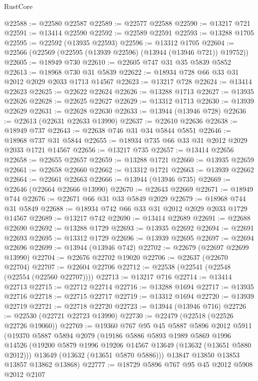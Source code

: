 \begin{lexlean}{RustCore}
\begin{coremodule}
@22588 := @22580 @22587
@22589 := @22577 @22588
@22590 := @13217 @721
@22591 := @13414 @22590
@22592 := @22589 @22591
@22593 := @13288 @1705
@22595 := @22592 (@13935 @22593)
@22596 := @13312 @1705
@22604 := @22566 (@22569 (@22595 (@13939 @22596) (@13944 (@13946 @721)) @19752))
@22605 := @18949 @730
@22610 := @22605 @747 @31 @35 @5839 @5852
@22613 := @18968 @730 @31 @5839
@22622 := @18934 @728 @66 @33 @31 @2012 @2029 @2033 @1713 @14567
@22623 := @13217 @728
@22624 := @13414 @22623
@22625 := @22622 @22624
@22626 := @13288 @1713
@22627 := @13935 @22626
@22628 := @22625 @22627
@22629 := @13312 @1713
@22630 := @13939 @22629
@22631 := @22628 @22630
@22633 := @13944 (@13946 @728)
@22636 := @22613 (@22631 @22633 @13990)
@22637 := @22610 @22636
@22638 := @18949 @737
@22643 := @22638 @746 @31 @34 @5844 @5851
@22646 := @18968 @737 @31 @5844
@22655 := @18934 @735 @66 @33 @31 @2012 @2029 @2033 @1721 @14567
@22656 := @13217 @735
@22657 := @13414 @22656
@22658 := @22655 @22657
@22659 := @13288 @1721
@22660 := @13935 @22659
@22661 := @22658 @22660
@22662 := @13312 @1721
@22663 := @13939 @22662
@22664 := @22661 @22663
@22666 := @13944 (@13946 @735)
@22669 := @22646 (@22664 @22666 @13990)
@22670 := @22643 @22669
@22671 := @18949 @744
@22676 := @22671 @66 @31 @33 @5849 @2029
@22679 := @18968 @744 @31 @5849
@22688 := @18934 @742 @66 @33 @31 @2012 @2029 @2033 @1729 @14567
@22689 := @13217 @742
@22690 := @13414 @22689
@22691 := @22688 @22690
@22692 := @13288 @1729
@22693 := @13935 @22692
@22694 := @22691 @22693
@22695 := @13312 @1729
@22696 := @13939 @22695
@22697 := @22694 @22696
@22699 := @13944 (@13946 @742)
@22702 := @22679 (@22697 @22699 @13990)
@22704 := @22676 @22702 @19020
@22706 := @22637 (@22670 @22704)
@22707 := @22604 @22706
@22712 := @22538 (@22541 (@22548 (@22554 (@22560 @22707))))
@22713 := @13217 @716
@22714 := @13414 @22713
@22715 := @22712 @22714
@22716 := @13288 @1694
@22717 := @13935 @22716
@22718 := @22715 @22717
@22719 := @13312 @1694
@22720 := @13939 @22719
@22721 := @22718 @22720
@22723 := @13944 (@13946 @716)
@22726 := @22530 (@22721 @22723 @13990)
@22730 := @22479 (@22518 (@22526 @22726 @19060))
@22769 := @19360
    @767
    @95
    @45
    @5887
    @5896
    @2012
    @5911
    (@19370
      @5887
      @5894
      @2079
      (@19186
        @5886
        @5893
        @1989
        @5869
        @1996
        @14526
        (@19200 @5879 @1996 @19206 @14567 @13649 (@13632 (@13651 @5880 @2012)))
        @13649
        (@13632 (@13651 @5870 @5886)))
      @13847
      @13850
      @13853
      @13857
      @13862
      @13868)
@22777 := @18729 @5896 @767 @95 @45 @2012 @5908 @2012 @2107

\end{coremodule}
\end{lexlean}
